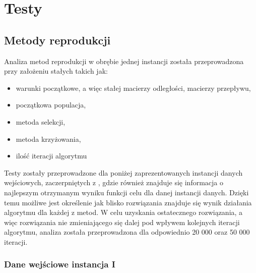\chapter{Testy}\label{cha:pierwszyDokument}






\section{Metody reprodukcji}\label{sec:strukturaDokumentu}

Analiza metod reprodukcji w obrębie jednej instancji została przeprowadzona przy założeniu stałych takich jak:
\begin{itemize}
\item
 warunki początkowe, a więc stałej macierzy odległości, macierzy przepływu,
\item
początkowa populacja,
\item
metoda selekcji,
\item
metoda krzyżowania,
\item
ilość iteracji algorytmu
\end{itemize}
\par
\vspace{0,4cm}
Testy zostały przeprowadzone dla poniżej zaprezentowanych instancji danych wejściowych, zaczerpniętych z \cite{qaplib}, gdzie również znajduje się informacja o najlepszym otrzymanym wyniku funkcji celu dla danej instancji danych. Dzięki temu możliwe jest określenie jak blisko rozwiązania znajduje się wynik działania algorytmu dla każdej z metod. W celu uzyskania ostatecznego rozwiązania, a więc rozwiązania nie zmieniającego się dalej pod wpływem kolejnych iteracji algorytmu, analiza została przeprowadzona dla odpowiednio 20 000 oraz 50 000 iteracji.\\

\subsection{Dane wejściowe instancja I}


